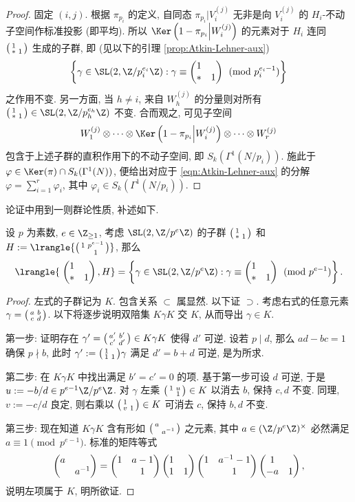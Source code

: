 \begin{proof}
	固定 $(i, j)$. 根据 $\pi_{p_i}$ 的定义, 自同态 $\pi_{p_i}|V^{(j)}_i$ 无非是向 $V^{(j)}_i$ 的 $H_i$-不动子空间作标准投影 (即平均). 所以 $\Ker\left(1 - \pi_{p_i} \middle| W^{(j)}_i \right)$ 的元素对于 $H_i$ 连同 $\bigl(\begin{smallmatrix} 1 &  \\ * & 1 \end{smallmatrix}\bigr)$ 生成的子群, 即 (见以下的引理 \ref{prop:Atkin-Lehner-aux})
	\[ \left\{ \gamma \in \SL(2, \Z/p_i^{e_i}\Z) : \gamma \equiv \twobigmatrix{1}{}{*}{1} \pmod{p_i^{e_i - 1}} \right\} \]
	之作用不变. 另一方面, 当 $h \neq i$, 来自 $W^{(j)}_h$ 的分量则对所有 $\twomatrix{1}{}{*}{1} \in \SL(2, \Z/p_h^{e_h}\Z)$ 不变. 合而观之, 可见子空间
	\[ W^{(j)}_1 \otimes \cdots \otimes \Ker\left(1 - \pi_{p_i} \middle| W^{(j)}_i \right) \otimes \cdots \otimes W^{(j)}_r \]
	包含于上述子群的直积作用下的不动子空间, 即 $S_k(\Gamma^1(N/p_i))$. 施此于 $\varphi \in \Ker(\pi) \cap S_k(\Gamma^1(N))$, 便给出对应于 \eqref{eqn:Atkin-Lehner-aux} 的分解 $\varphi = \sum_{i=1}^r \varphi_i$, 其中 $\varphi_i \in S_k(\Gamma^1(N/p_i))$.
\end{proof}

论证中用到一则群论性质, 补述如下.
\begin{lemma}\label{prop:Atkin-Lehner-aux}
	设 $p$ 为素数, $e \in \Z_{\geq 1}$, 考虑 $\SL(2, \Z/p^e \Z)$ 的子群 $\bigl(\begin{smallmatrix} 1 &  \\ * & 1 \end{smallmatrix}\bigr)$ 和 $H := \lrangle{\twomatrix{1}{p^{e-1}}{}{1}}$, 那么
	\[ \lrangle{ \; \twobigmatrix{1}{}{*}{1}, H } = \left\{ \gamma \in \SL(2, \Z/p^e\Z) : \gamma \equiv \twobigmatrix{1}{}{*}{1} \pmod{p^{e-1}} \right\}. \]
\end{lemma}
\begin{proof}
	左式的子群记为 $K$. 包含关系 $\subset$ 属显然. 以下证 $\supset$. 考虑右式的任意元素 $\gamma = \bigl(\begin{smallmatrix} a & b \\ c & d \end{smallmatrix}\bigr)$. 以下将逐步说明双陪集 $K\gamma K$ 交 $K$, 从而导出 $\gamma \in K$.

	第一步: 证明存在 $\gamma' = \bigl(\begin{smallmatrix} a' & b' \\ c' & d' \end{smallmatrix}\bigr) \in K\gamma K$ 使得 $d'$ 可逆. 设若 $p \mid d$, 那么 $ad-bc=1$ 确保 $p \nmid b$, 此时 $\gamma' := \bigl(\begin{smallmatrix} 1 &  \\ 1 & 1 \end{smallmatrix}\bigr) \gamma$ 满足 $d' = b + d$ 可逆, 是为所求.

	第二步: 在 $K\gamma K$ 中找出满足 $b'=c'=0$ 的项. 基于第一步可设 $d$ 可逆, 于是 $u := -b/d \in p^{e-1} \Z / p^e \Z$. 对 $\gamma$ 左乘 $\bigl(\begin{smallmatrix} 1 & u \\  & 1 \end{smallmatrix}\bigr) \in K$ 以消去 $b$, 保持 $c, d$ 不变. 同理, $v := -c/d$ 良定, 则右乘以 $\bigl(\begin{smallmatrix} 1 &  \\ v & 1 \end{smallmatrix}\bigr) \in K$ 可消去 $c$, 保持 $b, d$ 不变.
	
	第三步: 现在知道 $K\gamma K$ 含有形如 $\bigl(\begin{smallmatrix} a &  \\  & a^{-1} \end{smallmatrix}\bigr)$ 之元素, 其中 $a \in (\Z/p^e \Z)^\times$ 必然满足 $a \equiv 1 \pmod{p^{e-1}}$. 标准的矩阵等式
	\[ \begin{pmatrix} a &  \\  & a^{-1} \end{pmatrix} = \begin{pmatrix} 1 & a-1 \\  & 1 \end{pmatrix} \begin{pmatrix} 1 &  \\ 1 & 1 \end{pmatrix} \begin{pmatrix} 1 & a^{-1}-1 \\  & 1 \end{pmatrix} \begin{pmatrix} 1 &  \\ -a & 1 \end{pmatrix}, \]
	说明左项属于 $K$, 明所欲证.
\end{proof}

